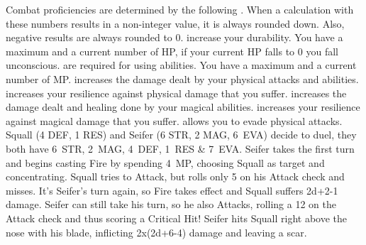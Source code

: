 %
\clearpage
%
{Combat proficiencies are determined by the following .
When a calculation with these numbers results in a non-integer value, it is always rounded down.
Also, negative results are always rounded to 0.\ofrow
{} increase your durability. You have a maximum and a current number of HP, if your current HP falls to 0 you fall unconscious. \ofrow
{} are required for using abilities. You have a maximum and a current number of MP. \ofrow
{} increases the damage dealt by your physical attacks and abilities. \ofrow
{} increases your resilience against physical damage that you suffer. \ofrow
{} increases the damage dealt and healing done by your magical abilities. \ofrow
{} increases your resilience against magical damage that you suffer. \ofrow
{} allows you to evade physical attacks.}
%
\vfill
%
%
%
\vfill
%
{
	Squall (4 DEF, 1 RES) and Seifer (6 STR, 2 MAG, 6~EVA) decide to duel, they both have 6~STR, 2~MAG, 4~DEF, 1~RES \& 7~EVA.
	Seifer takes the first turn and begins casting Fire by spending 4~MP, choosing Squall as target and concentrating.
	Squall tries to Attack, but rolls only 5 on his Attack check and misses.
	It's Seifer's turn again, so Fire takes effect and Squall suffers \mbox{2d+2-1} damage. 
	Seifer can still take his turn, so he also Attacks, rolling a 12 on the Attack check and thus scoring a Critical Hit!
	Seifer hits Squall right above the nose with his blade, inflicting \mbox{2x(2d+6-4)} damage and leaving a scar.
}
